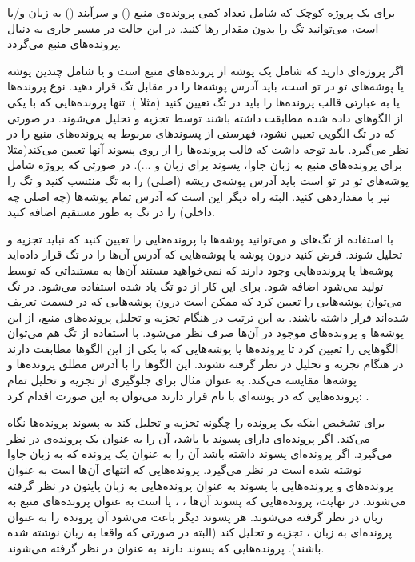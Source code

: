 برای یک پروژه کوچک که شامل تعداد کمی پرونده‌ی منبع () و سرآیند
() به زبان  و/یا  است، می‌توانید تگ  را بدون
مقدار رها کنید. در این حالت  در مسیر جاری به دنبال پرونده‌های منبع
می‌گردد.

اگر پروژه‌ای دارید که شامل یک پوشه از پرونده‌های منبع است و یا شامل چندین پوشه
یا پوشه‌های تو در تو است، باید آدرس پوشه‌ها را در مقابل تگ  قرار دهید.
نوع پرونده‌ها یا به عبارتی قالب پرونده‌ها را باید در تگ 
تعیین کنید (مثلا ). تنها پرونده‌هایی که با یکی از الگوهای داده شده
مطابقت داشته باشند توسط  تجزیه و تحلیل می‌شوند. در صورتی که در تگ
 الگویی تعیین نشود،  فهرستی از پسوندهای مربوط به
پرونده‌های منبع را در نظر می‌گیرد. باید توجه داشت که  قالب پرونده‌ها
را از روی پسوند آنها تعیین می‌کند(مثلا  برای پرونده‌های منبع به زبان
جاوا، پسوند  برای زبان  و ...). در صورتی که پروژه شامل پوشه‌های
تو در تو است باید آدرس پوشه‌ی ریشه (اصلی) را به تگ  منتسب کنید و تگ
 را نیز با  مقداردهی کنید. البته راه دیگر این است که آدرس
تمام پوشه‌ها (چه اصلی چه داخلی) را در تگ  به طور مستقیم اضافه کنید.

با استفاده از تگ‌های  و  می‌توانید پوشه‌ها یا
پرونده‌هایی را تعیین کنید که نباید تجزیه و تحلیل شوند. فرض کنید درون پوشه یا
پوشه‌هایی که آدرس آن‌ها را در تگ  قرار داده‌اید پوشه‌ها یا پرونده‌هایی
وجود دارند که نمی‌خواهید مستند آن‌ها به مستنداتی که توسط  تولید
می‌شود اضافه شود. برای این کار از دو تگ یاد شده استفاده می‌شود. در تگ
 می‌توان پوشه‌هایی را تعیین کرد که ممکن است درون پوشه‌هایی که در
قسمت  تعریف شده‌اند قرار داشته باشند. به این ترتیب در هنگام تجزیه و
تحلیل پرونده‌های منبع، از این پوشه‌ها و پرونده‌های موجود در آن‌ها صرف نظر
می‌شود. با استفاده از تگ  هم می‌توان الگوهایی را تعیین کرد
تا پرونده‌ها یا پوشه‌هایی که با یکی از این الگوها مطابقت دارند در هنگام تجزیه و
تحلیل در نظر گرفته نشوند.  این الگوها را با آدرس مطلق پرونده‌ها و
پوشه‌ها مقایسه می‌کند. به عنوان مثال برای جلوگیری از تجزیه و تحلیل تمام
پرونده‌هایی که در پوشه‌ای با نام  قرار دارند می‌توان به این صورت اقدام
کرد: .

برای تشخیص اینکه یک پرونده را چگونه تجزیه و تحلیل کند به پسوند پرونده‌ها نگاه
می‌کند. اگر پرونده‌ای دارای پسوند  یا  باشد، آن را به عنوان یک
پرونده‌ی  در نظر می‌گیرد. اگر پرونده‌ای پسوند  داشته باشد آن
را به عنوان یک پرونده که به زبان جاوا نوشته شده است در نظر می‌گیرد. پرونده‌هایی
که انتهای ‌آن‌ها  است به عنوان پرونده‌های  و پرونده‌هایی با
پسوند  به عنوان پرونده‌هایی به زبان پایتون  در نظر گرفته
می‌شوند. در نهایت، پرونده‌هایی که پسوند آن‌ها ، ، 
یا  است به عنوان پرونده‌های منبع به زبان  در نظر گرفته
می‌شوند. هر پسوند دیگر باعث می‌شود  آن پرونده را به عنوان پرونده‌ای
به زبان ، تجزیه و تحلیل کند (البته در صورتی که واقعا به زبان
 نوشته شده باشند). پرونده‌هایی که پسوند  دارند به عنوان
 در نظر گرفته می‌شوند.


